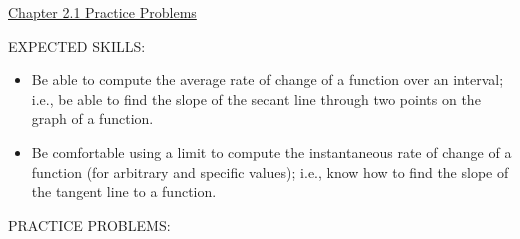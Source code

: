 \documentclass[12pt]{article}
\begin{document}
\begin{center}
\underline{\LARGE{Chapter 2.1 Practice Problems}}
\end{center}

\noindent EXPECTED SKILLS:

\begin{itemize}

\item Be able to compute the average rate of change of a function over an interval; i.e., be able to find the slope of the secant line through two points on the graph of a function.

\item Be comfortable using a limit to compute the instantaneous rate of change of a function (for arbitrary and specific values); i.e., know how to find the slope of the tangent line to a function.

\end{itemize}

\noindent PRACTICE PROBLEMS:

\medskip
\end{document}
